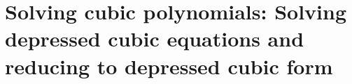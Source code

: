 
\chapter{Solving cubic polynomials: Solving depressed cubic equations and reducing to depressed cubic form}

